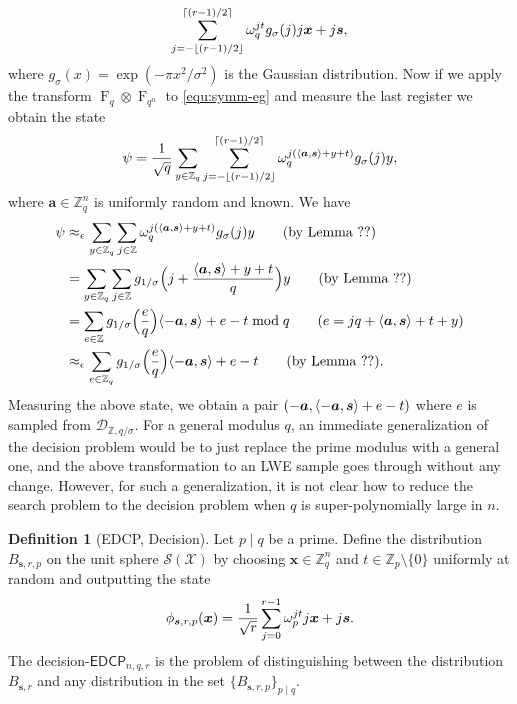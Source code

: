 \documentclass[11pt]{article}
\theoremstyle{plain}
\theoremstyle{definition}
\newtheorem{definition}[theorem]{Definition}
\DeclareMathOperator{\qft}{F}
\let\ket\relax
\DeclarePairedDelimiter{\ket}{\lvert}{\rangle}
\DeclarePairedDelimiter{\lrang}{\langle}{\rangle}
\def\Z{\mathbb{Z}}
\def\edcp{\mathsf{EDCP}}
\def\SX{\mathcal{S(X)}}
\begin{document}
\begin{equation}
    \label{equ:symm-eg}
    \sum_{j = -\lfloor (r - 1) / 2 \rfloor}^{\lceil (r - 1) / 2 \rceil} \omega_q^{jt} g_\sigma(j) \ket{j}\ket{\bm{x} + j\bm{s}},
\end{equation}
where $g_\sigma(x) = \exp(-\pi x^2 / \sigma^2)$ is the Gaussian distribution. Now if we apply the transform $\qft_q \otimes \qft_{q^n}$ to \eqref{equ:symm-eg} and measure the last register we obtain the state
\[ \ket{\psi} =  \frac{1}{\sqrt{q}} \sum_{y \in \Z_q} \sum_{j = -\lfloor (r - 1) / 2 \rfloor}^{\lceil (r - 1) / 2 \rceil} \omega_q^{j(\lrang{\bm{a}, \bm{s}} + y + t)} g_\sigma(j) \ket{y},\]
where $\bm{a} \in \Z_q^n$ is uniformly random and known. We have
\begin{align*}
    \ket{\psi}
    & \approx_\epsilon \sum_{y \in \Z_q} \sum_{j \in \Z} \omega_q^{j(\lrang{\bm{a}, \bm{s}} + y + t)} g_\sigma(j) \ket{y} \tag{by Lemma ??} \\
    & = \sum_{y \in \Z_q} \sum_{j \in \Z} g_{1/\sigma} \Big( j + \frac{\lrang{\bm{a}, \bm{s}} + y + t}{q} \Big) \ket{y} \tag{by Lemma ??} \\
    & = \sum_{e \in \Z} g_{1/\sigma} \Big( \frac{e}{q} \Big) \ket{\lrang{-\bm{a}, \bm{s}} + e - t \bmod q} \tag{$e = jq + \lrang{\bm{a}, \bm{s}} + t + y$} \\
    & \approx_\epsilon \sum_{e \in \Z_q} g_{1/\sigma} \Big( \frac{e}{q} \Big) \ket{\lrang{-\bm{a}, \bm{s}} + e - t} \tag{by Lemma ??}.
\end{align*}
Measuring the above state, we obtain a pair $(-\bm{a}, \lrang{-\bm{a}, \bm{s}} + e - t)$ where $e$ is sampled from $\mathcal{D}_{\Z, q / \sigma}$. For a general modulus $q$, an immediate generalization of the decision problem would be to just replace the prime modulus with a general one, and the above transformation to an LWE sample goes through without any change. However, for such a generalization, it is not clear how to reduce the search problem to the decision problem when $q$ is super-polynomially large in $n$.
\begin{definition}[EDCP, Decision]
    Let $p \mid q$ be a prime. Define the distribution $B_{\bm{s}, r, p}$ on the unit sphere $\SX$ by choosing $\bm{x} \in \Z_q^n$ and $t \in \Z_p {\setminus} \{ 0 \}$ uniformly at random and outputting the state
    \begin{equation}
        \ket{
            \phi_{\bm{s}, r, p}(\bm{x})} = \frac{1}{\sqrt{r}} \sum_{j = 0}^{r - 1} \omega_p^{jt} \ket{j}\ket{\bm{x} + j\bm{s}}.
    \end{equation}
    The decision-$\edcp_{n, q, r}$ is the problem of distinguishing between the distribution $B_{\bm{s}, r}$ and any distribution in the set $\{ B_{\bm{s}, r, p} \}_{p \mid q}$.
\end{definition}
\end{document}
